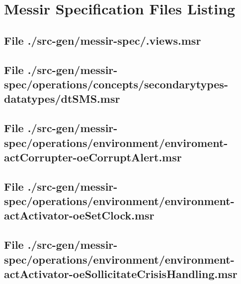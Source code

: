 \chapter{Messir Specification Files Listing}

\section[File /src-gen/messir-spec/.views.msr]{File ./src-gen/messir-spec/.views.msr}
\scriptsize

\normalsize
	
\section[File /src-gen/messir-spec/operations/concepts/secondarytypes-datatypes/dtSMS.msr]{File ./src-gen/messir-spec/operations/concepts/secondarytypes-datatypes/dtSMS.msr}
\scriptsize

\normalsize
	
\section[File /src-gen/messir-spec.../enviroment-actCorrupter-oeCorruptAlert.msr]{File ./src-gen/messir-spec/operations/environment/enviroment-actCorrupter-oeCorruptAlert.msr}
\scriptsize

\normalsize
	
\section[File /src-gen/messir-spec/operations.../environment-actActivator-oeSetClock.msr]{File ./src-gen/messir-spec/operations/environment/environment-actActivator-oeSetClock.msr}
\scriptsize

\normalsize
	
\section[File /src-gen.../environment-actActivator-oeSollicitateCrisisHandling.msr]{File ./src-gen/messir-spec/operations/environment/environment-actActivator-oeSollicitateCrisisHandling.msr}
\scriptsize

\normalsize
	
